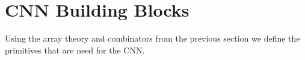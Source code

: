 % 


%   
%   


\section{CNN Building Blocks\label{sec:cnn}}

Using the array theory and combinators from the previous section we
define the primitives that are need for the CNN.

